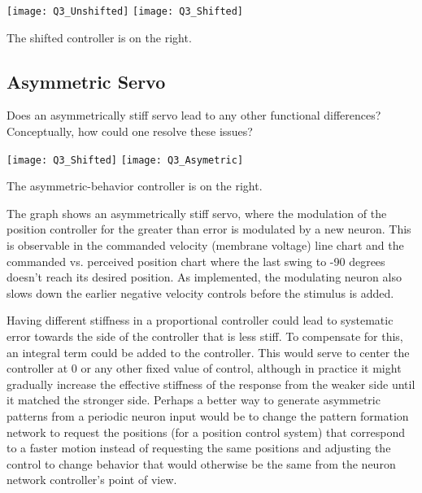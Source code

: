 \texttt{[image: Q3\_Unshifted]}
\texttt{[image: Q3\_Shifted]}

The shifted controller is on the right.

\subsection{Asymmetric Servo}

Does an asymmetrically stiff servo lead to any other functional differences? Conceptually, how could one resolve these issues?

\texttt{[image: Q3\_Shifted]}
\texttt{[image: Q3\_Asymetric]}

The asymmetric-behavior controller is on the right.

The graph shows an asymmetrically stiff servo, where the modulation of the position controller for the greater than error is modulated by a new neuron. This is observable in the commanded velocity (membrane voltage) line chart and the commanded vs. perceived position chart where the last swing to -90 degrees doesn't reach its desired position. As implemented, the modulating neuron also slows down the earlier negative velocity controls before the stimulus is added.

Having different stiffness in a proportional controller could lead to systematic error towards the side of the controller that is less stiff. To compensate for this, an integral term could be added to the controller. This would serve to center the controller at 0 or any other fixed value of control, although in practice it might gradually increase the effective stiffness of the response from the weaker side until it matched the stronger side. Perhaps a better way to generate asymmetric patterns from a periodic neuron input would be to change the pattern formation network to request the positions (for a position control system) that correspond to a faster motion instead of requesting the same positions and adjusting the control to change behavior that would otherwise be the same from the neuron network controller's point of view.


